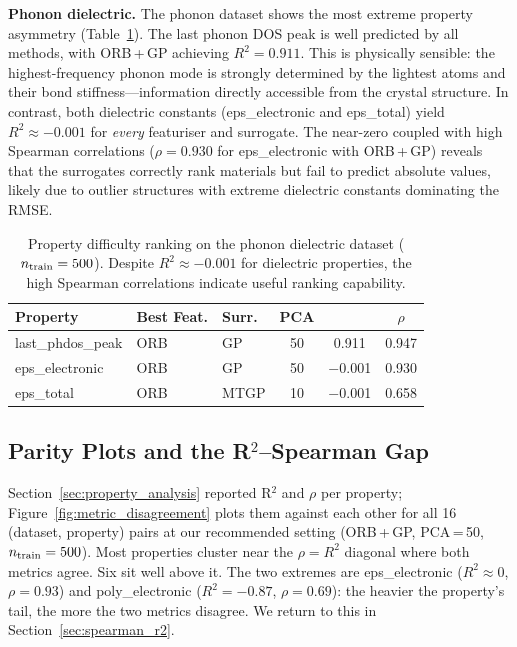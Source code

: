 \textbf{Phonon dielectric.}
The phonon dataset shows the most extreme property asymmetry (Table~\ref{tab:property_difficulty_phonon}).
The last phonon DOS peak is well predicted by all methods, with ORB\,+\,GP achieving $R^2 = 0.911$.
This is physically sensible: the highest-frequency phonon mode is strongly determined by the lightest atoms and their bond stiffness---information directly accessible from the crystal structure.
In contrast, both dielectric constants (eps\_electronic and eps\_total) yield $R^2 \approx -0.001$ for \emph{every} featuriser and surrogate.
The near-zero \Rtwo{} coupled with high Spearman correlations ($\rho = 0.930$ for eps\_electronic with ORB\,+\,GP) reveals that the surrogates correctly rank materials but fail to predict absolute values, likely due to outlier structures with extreme dielectric constants dominating the RMSE.

\begin{table}[H]
    \centering
    \caption{Property difficulty ranking on the phonon dielectric dataset ($n_{\text{train}} = 500$). Despite $R^2 \approx -0.001$ for dielectric properties, the high Spearman correlations indicate useful ranking capability.}
    \label{tab:property_difficulty_phonon}
    \small
    \begin{tabular}{@{}lllccc@{}}
        \toprule
        \textbf{Property} & \textbf{Best Feat.} & \textbf{Surr.} & \textbf{PCA} & \textbf{\Rtwo{}} & \textbf{$\rho$} \\
        \midrule
        last\_phdos\_peak  & ORB  & GP   & 50 & 0.911 & 0.947 \\
        eps\_electronic    & ORB  & GP   & 50 & $-$0.001 & 0.930 \\
        eps\_total         & ORB  & MTGP & 10 & $-$0.001 & 0.658 \\
        \bottomrule
    \end{tabular}
\end{table}


\subsection{Parity Plots and the R$^{2}$--Spearman Gap}
\label{sec:parity_plots}

Section~\ref{sec:property_analysis} reported R$^{2}$ and $\rho$ per property; Figure~\ref{fig:metric_disagreement} plots them against each other for all 16 (dataset, property) pairs at our recommended setting (ORB\,+\,GP, PCA\,=\,50, $n_{\text{train}} = 500$).
Most properties cluster near the $\rho = R^{2}$ diagonal where both metrics agree.
Six sit well above it.
The two extremes are eps\_electronic ($R^{2} \approx 0$, $\rho = 0.93$) and poly\_electronic ($R^{2} = -0.87$, $\rho = 0.69$): the heavier the property's tail, the more the two metrics disagree.
We return to this in Section~\ref{sec:spearman_r2}.

